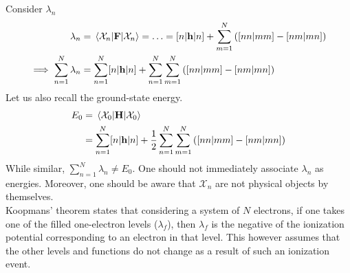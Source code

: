 \documentclass[12pt,a4paper,titlepage]{article}
\newcommand{\Chi}{\mathcal{X}} %
\begin{document}
Consider $\lambda_{n}$
\begin{equation}
\begin{aligned}
\lambda_{n}&=\mel{\Chi_{n}}{\vb{F}}{\Chi_{n}}=\ldots=[n|\vb{h}|n]+\sum_{m=1}^{N}\qty([nn|mm]-[nm|mn])\\
\implies \sum_{n=1}^{N}\lambda_{n}&=\sum_{n=1}^{N}[n|\vb{h}|n]+\sum_{n=1}^{N}\sum_{m=1}^{N}\qty([nn|mm]-[nm|mn])
\end{aligned}
\end{equation}
Let us also recall the ground-state energy.
\begin{equation}
\begin{aligned}
E_{0}&=\mel{\Chi_{0}}{\vb{H}}{\Chi_{0}}\\
&=\sum_{n=1}^{N}[n|\vb{h}|n]+\frac{1}{2}\sum_{n=1}^{N}\sum_{m=1}^{N}\qty([nn|mm]-[nm|mn])
\end{aligned}
\end{equation}
While similar, $\sum_{n=1}^{N}\lambda_{n}\neq E_{0}$. One should not immediately associate $\lambda_{n}$ as energies. Moreover, one should be aware that $\Chi_{n}$ are not physical objects by themselves.\\

Koopmans' theorem states that considering a system of $N$ electrons, if one takes one of the filled one-electron levels ($\lambda_{f}$), then $\lambda_{f}$ is the negative of the ionization potential corresponding to an electron in that level. This however assumes that the other levels and functions do not change as a result of such an ionization event.
\begin{center}
\end{center}
\end{document}
